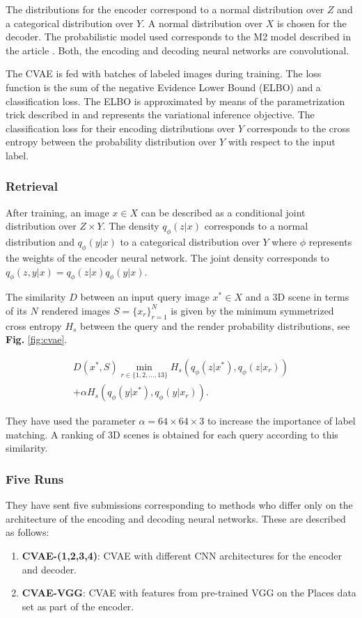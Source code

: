\documentclass[../main.tex]{subfiles}
\begin{document}
The distributions for the encoder correspond to a normal distribution over $Z$ and a categorical distribution over $Y$. A normal distribution over $X$ is chosen for the decoder. The probabilistic model used corresponds to the M2 model described in the article \cite{kingma2014semi}. Both, the encoding and decoding neural networks are convolutional.

The CVAE is fed with batches of labeled images during training. The loss function is the sum of the negative Evidence Lower Bound (ELBO) and a classification loss. The ELBO is approximated by means of the parametrization trick described in \cite{kingma2014semi, kingma2013auto} and represents the variational inference objective. The classification loss for their encoding distributions over $Y$ corresponds to the cross entropy between the probability distribution over $Y$ with respect to the input label. 

\subsubsection{Retrieval}
After training, an image $x\in X$ can be described as a conditional joint distribution over $Z\times Y$. The density $q_\phi(z|x)$ corresponds to a normal distribution and $q_\phi(y|x)$ to a categorical distribution over $Y$ where $\phi$ represents the weights of the encoder neural network. The joint density corresponds to $q_\phi(z,y|x) = q_\phi(z|x) q_\phi(y|x)$.

The similarity $D$ between an input query image $x^*\in X$ and a 3D scene in terms of its $N$ rendered images $S = \{x_r\}_{r=1}^{N}$ is given by the minimum symmetrized cross entropy $H_s$ between the query and the render probability distributions, see \textbf{Fig.} \ref{fig:cvae}.

\begin{multline}
 D(x^*, S)\min_{r\in\{1,2,\ldots,13\} }H_s(q_\phi(z|x^*),q_\phi(z|x_{r}))\\
+\alpha H_s(q_\phi(y|x^*),q_\phi(y|x_{r})).
\end{multline}

They have used the parameter $\alpha = 64\times 64 \times 3$ to increase the importance of label matching. A ranking of 3D scenes is obtained for each query according to this similarity.

\subsubsection{Five Runs}
They have sent five submissions corresponding to methods who differ only on the architecture of the encoding and decoding neural networks. These are described as follows:
\begin{enumerate}
    \item \textbf{CVAE-(1,2,3,4)}: CVAE with different CNN architectures for the encoder and decoder.
    \item \textbf{CVAE-VGG}: CVAE with features from pre-trained VGG \cite{gkallia2017keras_places365} on the Places data set \cite{Places88} as part of the encoder.
    
\end{enumerate}
\end{document}
